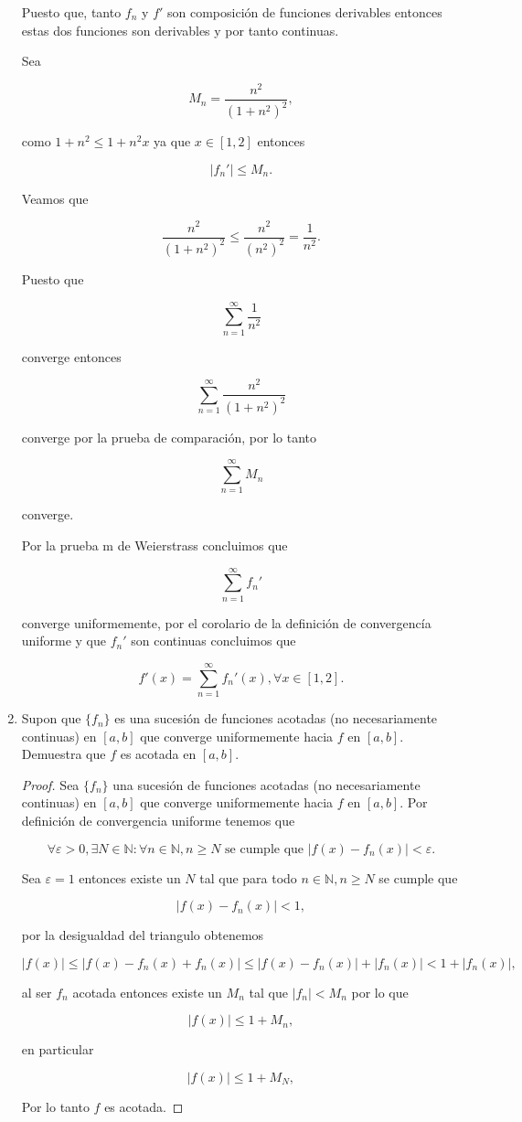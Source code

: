 \documentclass[letterpaper]{article}
\theoremstyle{definition}
\theoremstyle{lemathm}
\theoremstyle{lemademthm}
\newcommand{\N}{\mathbb{N}}
\begin{document}
\begin{enumerate}
		Puesto que, tanto $f_n$ y $f'$ son composición de funciones derivables entonces estas dos funciones son derivables y por tanto continuas.

		Sea 
		
		\[M_n = \frac{n^2}{(1+n^2)^2},\]

		como $1+n^2\leq1+n^2x$ ya que $x\in[1,2]$ entonces

		\[|f_n'| \leq M_n.\]

		Veamos que

		\[\frac{n^2}{(1+n^2)^2} \leq \frac{n^2}{(n^2)^2} = \frac{1}{n^2}.\]

		Puesto que

		\[\sum_{n=1}^{\infty} \frac{1}{n^2}\]

		converge entonces

		\[\sum_{n=1}^{\infty} \frac{n^2}{(1+n^2)^2}\]

		converge por la prueba de comparación, por lo tanto

		\[\sum_{n = 1}^{\infty} M_n\]

		converge.
		
		Por la prueba m de Weierstrass concluimos que

		\[\sum_{n=1}^{\infty} f_n'\]

		converge uniformemente, por el corolario de la definición de convergencía uniforme y que $f_n'$ son continuas concluimos que

		\[f'(x) = \sum_{n=1}^{\infty} f_n'(x), \forall x \in [1,2].\]

		\item Supon que $\{f_n\}$ es una sucesión de funciones acotadas (no necesariamente continuas) en $[a,b]$ que converge uniformemente hacia $f$ en $[a,b]$. Demuestra que $f$ es acotada en $[a,b]$.
		
		\begin{proof}
			Sea $\{f_n\}$ una sucesión de funciones acotadas (no necesariamente continuas) en $[a,b]$ que converge uniformemente hacia $f$ en $[a,b]$. Por definición de convergencia uniforme tenemos que

			\[\forall \varepsilon > 0, \exists N \in \N : \forall n \in \N, n \geq N \text{ se cumple que } |f(x) - f_n(x)| < \varepsilon.\]

			Sea $\varepsilon = 1$ entonces existe un $N$ tal que para todo $n \in \N, n \geq N$ se cumple que

			\[|f(x) - f_n(x)| < 1,\]

			por la desigualdad del triangulo obtenemos

			\[|f(x)| \leq |f(x) - f_n(x) + f_n(x)| \leq |f(x) - f_n(x)| + |f_n(x)| < 1 + |f_n(x)|,\]
			
			al ser $f_n$ acotada entonces existe un $M_n$ tal que $|f_n| < M_n$ por lo que

			\[|f(x)| \leq 1 + M_n,\]

			en particular

			\[|f(x)| \leq 1 + M_N,\]

			Por lo tanto $f$ es acotada.
		\end{proof}


	\end{enumerate}
	
\end{document}
